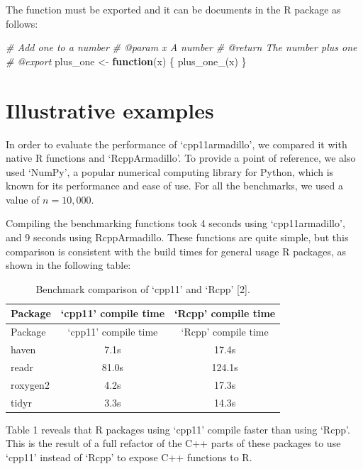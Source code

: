 \documentclass[preprint,12pt, a4paper]{elsarticle}
\newenvironment{Shaded}{\begin{snugshade}}{\end{snugshade}}
\newcommand{\CommentTok}[1]{\textcolor[rgb]{0.56,0.35,0.01}{\textit{#1}}}
\newcommand{\ControlFlowTok}[1]{\textcolor[rgb]{0.13,0.29,0.53}{\textbf{#1}}}
\newcommand{\FunctionTok}[1]{\textcolor[rgb]{0.00,0.00,0.00}{#1}}
\newcommand{\NormalTok}[1]{#1}
\newcommand{\OtherTok}[1]{\textcolor[rgb]{0.56,0.35,0.01}{#1}}
\begin{document}
The function must be exported and it can be documents in the R package
as follows:

\begin{Shaded}
\begin{Highlighting}[]
\CommentTok{\#\textquotesingle{} Add one to a number}
\CommentTok{\#\textquotesingle{} @param x A number}
\CommentTok{\#\textquotesingle{} @return The number plus one}
\CommentTok{\#\textquotesingle{} @export}
\NormalTok{plus\_one }\OtherTok{\textless{}{-}} \ControlFlowTok{function}\NormalTok{(x) \{}
  \FunctionTok{plus\_one\_}\NormalTok{(x)}
\NormalTok{\}}
\end{Highlighting}
\end{Shaded}

\section{Illustrative examples}\label{illustrative-examples}

In order to evaluate the performance of `cpp11armadillo', we compared it
with native R functions and `RcppArmadillo'. To provide a point of
reference, we also used `NumPy', a popular numerical computing library
for Python, which is known for its performance and ease of use. For all
the benchmarks, we used a value of \(n = 10,000\).

Compiling the benchmarking functions took 4 seconds using
`cpp11armadillo', and 9 seconds using RcppArmadillo. These functions are
quite simple, but this comparison is consistent with the build times for
general usage R packages, as shown in the following table:

\begin{longtable}[]{@{}lcc@{}}
\caption{Benchmark comparison of `cpp11' and `Rcpp'
{[}2{]}.}\tabularnewline
\toprule\noalign{}
Package & `cpp11' compile time & `Rcpp' compile time \\
\midrule\noalign{}
\endfirsthead
\toprule\noalign{}
Package & `cpp11' compile time & `Rcpp' compile time \\
\midrule\noalign{}
\endhead
\bottomrule\noalign{}
\endlastfoot
haven & 7.1s & 17.4s \\
readr & 81.0s & 124.1s \\
roxygen2 & 4.2s & 17.3s \\
tidyr & 3.3s & 14.3s \\
\end{longtable}

Table 1 reveals that R packages using `cpp11' compile faster than using
`Rcpp'. This is the result of a full refactor of the C++ parts of these
packages to use `cpp11' instead of `Rcpp' to expose C++ functions to R.
\end{document}
